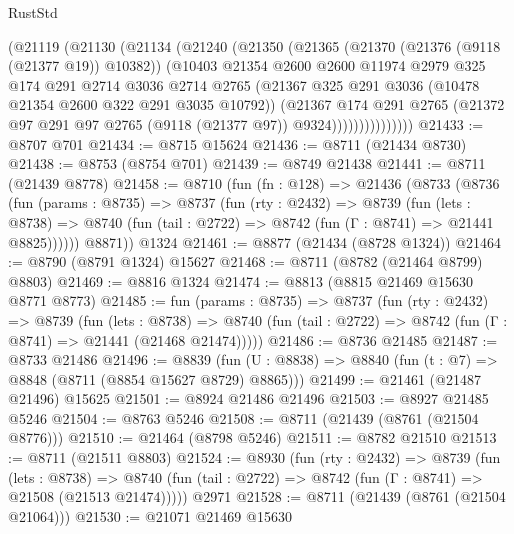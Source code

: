 \begin{lexlean}{RustStd}
\begin{coremodule}
                (@21119
                  (@21130
                    (@21134
                      (@21240
                        (@21350
                          (@21365
                            (@21370 (@21376 (@9118 (@21377 @19)) @10382))
                            (@10403
                              @21354
                              @2600
                              @2600
                              @11974
                              @2979
                              @325
                              @174
                              @291
                              @2714
                              @3036
                              @2714
                              @2765
                              (@21367 @325 @291 @3036 (@10478 @21354 @2600 @322 @291 @3035 @10792))
                              (@21367
                                @174
                                @291
                                @2765
                                (@21372 @97 @291 @97 @2765 (@9118 (@21377 @97)) @9324)))))))))))))))
@21433 := @8707 @701
@21434 := @8715 @15624
@21436 := @8711 (@21434 @8730)
@21438 := @8753 (@8754 @701)
@21439 := @8749 @21438
@21441 := @8711 (@21439 @8778)
@21458 := @8710
    (fun (fn : @128) =>
    @21436
      (@8733
        (@8736
          (fun (params : @8735) =>
          @8737
            (fun (rty : @2432) =>
            @8739
              (fun (lets : @8738) =>
              @8740 (fun (tail : @2722) => @8742 (fun (Γ : @8741) => @21441 @8825))))))
        @8871))
    @1324
@21461 := @8877 (@21434 (@8728 @1324))
@21464 := @8790 (@8791 @1324) @15627
@21468 := @8711 (@8782 (@21464 @8799) @8803)
@21469 := @8816 @1324
@21474 := @8813 (@8815 @21469 @15630 @8771 @8773)
@21485 := fun (params : @8735) =>
  @8737
    (fun (rty : @2432) =>
    @8739
      (fun (lets : @8738) =>
      @8740 (fun (tail : @2722) => @8742 (fun (Γ : @8741) => @21441 (@21468 @21474)))))
@21486 := @8736 @21485
@21487 := @8733 @21486
@21496 := @8839
    (fun (U : @8838) => @8840 (fun (t : @7) => @8848 (@8711 (@8854 @15627 @8729) @8865)))
@21499 := @21461 (@21487 @21496) @15625
@21501 := @8924 @21486 @21496
@21503 := @8927 @21485 @5246
@21504 := @8763 @5246
@21508 := @8711 (@21439 (@8761 (@21504 @8776)))
@21510 := @21464 (@8798 @5246)
@21511 := @8782 @21510
@21513 := @8711 (@21511 @8803)
@21524 := @8930
    (fun (rty : @2432) =>
    @8739
      (fun (lets : @8738) =>
      @8740 (fun (tail : @2722) => @8742 (fun (Γ : @8741) => @21508 (@21513 @21474)))))
    @2971
@21528 := @8711 (@21439 (@8761 (@21504 @21064)))
@21530 := @21071 @21469 @15630

\end{coremodule}
\end{lexlean}

